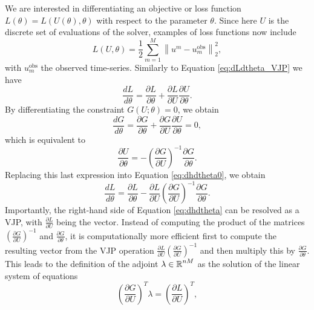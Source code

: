 We are interested in differentiating an objective or loss function $L(\theta) = L(U(\theta), \theta)$ with respect to the parameter $\theta$. 
Since here $U$ is the discrete set of evaluations of the solver, examples of loss functions now include 
\begin{equation}
    L(U, \theta) 
    = 
    \frac{1}{2} \sum_{m=1}^M \left \| u^m - u_m^\text{obs} \right \|_2^2, 
\end{equation}
with $u_m^\text{obs}$ the observed time-series. 
Similarly to Equation \eqref{eq:dLdtheta_VJP} we have 
\begin{equation}
    \frac{dL}{d\theta} 
    = 
    \frac{\partial L}{\partial \theta} 
    + 
    \frac{\partial L}{\partial U} \frac{\partial U}{\partial \theta}.
    \label{eq:dhdtheta0}
\end{equation}
By differentiating the constraint $G(U; \theta) = 0$, we obtain
\begin{equation}
    \frac{dG}{d\theta} 
    = 
    \frac{\partial G}{\partial \theta} 
    + 
    \frac{\partial G}{\partial U} \frac{\partial U}{\partial \theta}
    =
    0,
\end{equation}
which is equivalent to 
\begin{equation}
    \frac{\partial U}{\partial \theta} 
    = 
    - \left( \frac{\partial G}{\partial U} \right)^{-1} \frac{\partial G}{\partial \theta}.
    \label{eq:adjoint-inversion-implicit-theorem}
\end{equation}
Replacing this last expression into Equation \eqref{eq:dhdtheta0}, we obtain
\begin{equation}
    \frac{dL}{d\theta} 
    =
    \frac{\partial L}{\partial \theta} 
    - 
    \frac{\partial L}{\partial U}
    \left( \frac{\partial G}{\partial U} \right)^{-1} 
    \frac{\partial G}{\partial \theta}.
    \label{eq:dhdtheta}
\end{equation}
Importantly, the right-hand side of Equation \eqref{eq:dhdtheta} can be resolved as a VJP, with $\frac{\partial L}{\partial U}$ being the vector.
Instead of computing the product of the matrices $\left( \frac{\partial G}{\partial U} \right)^{-1}$ and $\frac{\partial G}{\partial \theta}$, it is computationally more efficient first to compute the resulting vector from the VJP operation $\frac{\partial L}{\partial U} \left( \frac{\partial G}{\partial U} \right)^{-1}$ and then multiply this by $\frac{\partial G}{\partial \theta}$.
This leads to the definition of the adjoint $\lambda \in \operatorname{\mathbb{R}}^{nM}$ as the solution of the linear system of equations 
\begin{equation}
    \left( \frac{\partial G}{\partial U}\right)^T \lambda 
    =  
    \left( \frac{\partial L}{\partial U} \right)^T,
    \label{eq:adjoint-state-equation}
\end{equation}

